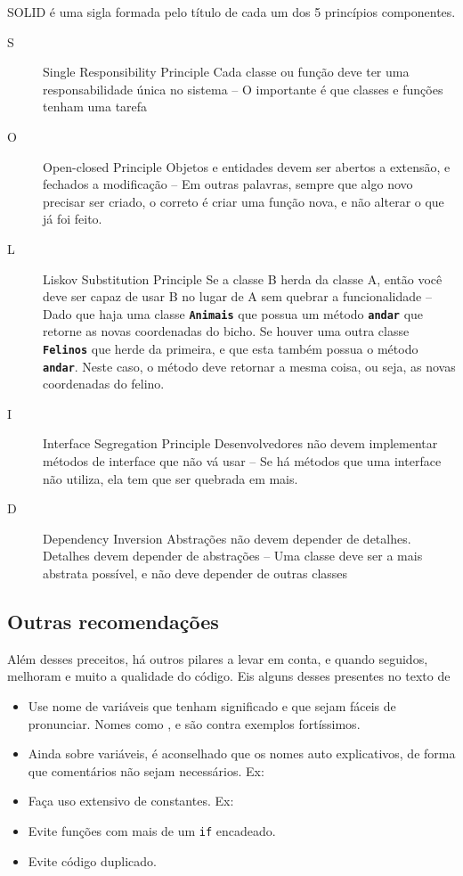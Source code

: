 SOLID é uma sigla formada pelo título de cada um dos 5 princípios componentes.
\begin{description}
    \item[S] Single Responsibility Principle \dir Cada classe ou função deve ter uma responsabilidade única no
    sistema -- O importante é que classes e funções tenham uma tarefa
    \item[O] Open-closed Principle \dir Objetos e entidades devem ser abertos a extensão, e fechados a modificação
    -- Em outras palavras, sempre que algo novo precisar ser criado, o correto é criar uma função nova, e não
    alterar o que já foi feito.
    \item[L] Liskov Substitution Principle \dir Se a classe B herda da classe A, então você deve ser capaz de usar
    B no lugar de A sem quebrar a funcionalidade -- Dado que haja uma classe \textbf{\texttt{Animais}} que possua
    um método \textbf{\texttt{andar}} que retorne as novas coordenadas do bicho. Se houver uma outra classe
    \textbf{\texttt{Felinos}} que herde da primeira, e que esta também possua o método \textbf{\texttt{andar}}.
    Neste caso, o método deve retornar a mesma coisa, ou seja, as novas coordenadas do felino.
    \item[I] Interface Segregation Principle \dir Desenvolvedores não devem implementar métodos de interface que
    não vá usar -- Se há métodos que uma interface não utiliza, ela tem que ser quebrada em mais.
    \item[D] Dependency Inversion \dir Abstrações não devem depender de detalhes. Detalhes devem depender de
    abstrações -- Uma classe deve ser a mais abstrata possível, e não deve depender de outras classes
\end{description}


\subsection{Outras recomendações}\label{subsec:recomendacoes}

Além desses preceitos, há outros pilares a levar em conta, e quando seguidos, melhoram e muito a qualidade do
código. Eis alguns desses presentes no texto de \cite{BP}
\begin{itemize}
    \item Use nome de variáveis que tenham significado e que sejam fáceis de pronunciar. Nomes como \texttt{},
    \texttt{} e \texttt{} são contra exemplos fortíssimos.
    \item Ainda sobre variáveis, é aconselhado que os nomes auto explicativos, de forma que comentários não sejam
    necessários. Ex: \texttt{} \dir \texttt{}
    \item Faça uso extensivo de constantes. Ex: \texttt{} \dir \texttt{}
    \item Evite funções com mais de um \texttt{if} encadeado.
    \item Evite código duplicado.
\end{itemize}


